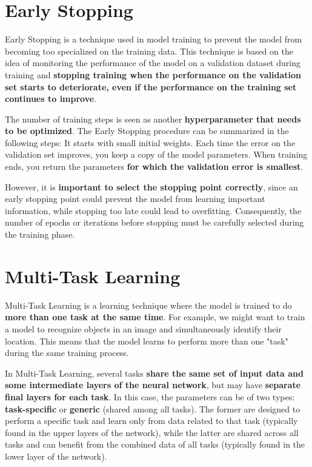 \section{Early Stopping}

Early Stopping is a technique used in model training to prevent the model from becoming too specialized on the training data. 
This technique is based on the idea of monitoring the performance of the model on a validation dataset during training and \textbf{stopping training when the performance on the validation set starts to deteriorate, even if the performance on the training set continues to improve}.

The number of training steps is seen as another \textbf{hyperparameter that needs to be optimized}. The Early Stopping procedure can be summarized in the following steps: It starts with small initial weights. Each time the error on the validation set improves, you keep a copy of the model parameters. When training ends, you return the parameters \textbf{for which the validation error is smallest}.

However, it is \textbf{important to select the stopping point correctly}, since an early stopping point could prevent the model from learning important information, while stopping too late could lead to overfitting. Consequently, the number of epochs or iterations before stopping must be carefully selected during the training phase.

\section{Multi-Task Learning}

Multi-Task Learning is a learning technique where the model is trained to do \textbf{more than one task at the same time}. For example, we might want to train a model to recognize objects in an image and simultaneously identify their location. This means that the model learns to perform more than one "task" during the same training process.

In Multi-Task Learning, several tasks \textbf{share the same set of input data and some intermediate layers of the neural network}, but may have \textbf{separate final layers for each task}. In this case, the parameters can be of two types: \textbf{task-specific} or \textbf{generic} (shared among all tasks). The former are designed to perform a specific task and learn only from data related to that task (typically found in the upper layers of the network), while the latter are shared across all tasks and can benefit from the combined data of all tasks (typically found in the lower layer of the network).

